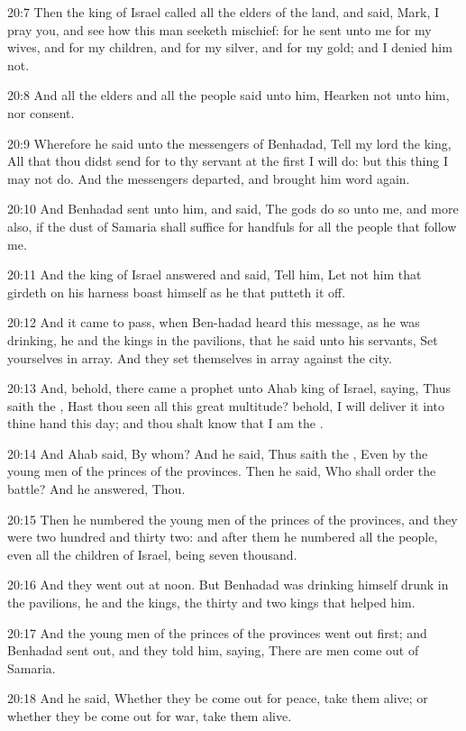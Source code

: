 20:7 Then the king of Israel called all the elders of the land, and
said, Mark, I pray you, and see how this man seeketh mischief: for he
sent unto me for my wives, and for my children, and for my silver, and
for my gold; and I denied him not.

20:8 And all the elders and all the people said unto him, Hearken not
unto him, nor consent.

20:9 Wherefore he said unto the messengers of Benhadad, Tell my lord
the king, All that thou didst send for to thy servant at the first I
will do: but this thing I may not do. And the messengers departed, and
brought him word again.

20:10 And Benhadad sent unto him, and said, The gods do so unto me,
and more also, if the dust of Samaria shall suffice for handfuls for
all the people that follow me.

20:11 And the king of Israel answered and said, Tell him, Let not him
that girdeth on his harness boast himself as he that putteth it off.

20:12 And it came to pass, when Ben-hadad heard this message, as he
was drinking, he and the kings in the pavilions, that he said unto his
servants, Set yourselves in array. And they set themselves in array
against the city.

20:13 And, behold, there came a prophet unto Ahab king of Israel,
saying, Thus saith the \LORD, Hast thou seen all this great multitude?
behold, I will deliver it into thine hand this day; and thou shalt
know that I am the \LORD.

20:14 And Ahab said, By whom? And he said, Thus saith the \LORD, Even
by the young men of the princes of the provinces. Then he said, Who
shall order the battle? And he answered, Thou.

20:15 Then he numbered the young men of the princes of the provinces,
and they were two hundred and thirty two: and after them he numbered
all the people, even all the children of Israel, being seven thousand.

20:16 And they went out at noon. But Benhadad was drinking himself
drunk in the pavilions, he and the kings, the thirty and two kings
that helped him.

20:17 And the young men of the princes of the provinces went out
first; and Benhadad sent out, and they told him, saying, There are men
come out of Samaria.

20:18 And he said, Whether they be come out for peace, take them
alive; or whether they be come out for war, take them alive.

